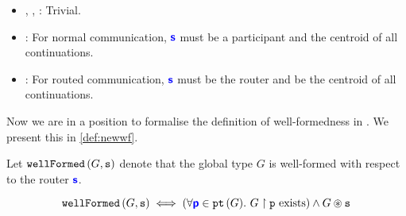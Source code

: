 \begin{itemize}
\item 
{}, 
, 
:
Trivial.

\item 
{}:
For normal communication, ${\color{blue}\bm{\mathsf{s}}}$ must
be a participant and the centroid of all continuations.

\item 
{}:
For routed communication, ${\color{blue}\bm{\mathsf{s}}}$ must
be the router and be the centroid of all continuations.

\end{itemize}

Now we are in a position to formalise the definition
of well-formedness in \newtheory. We present this in
\cref{def:newwf}.

\begin{definition}
Let $\textnormal{\texttt{wellFormed}}\left(G, {\mathtt{s}}\right)$ 
denote that the global type $G$
is well-formed with respect to the router ${\color{blue}\bm{\mathsf{s}}}$.

\[
\textnormal{\texttt{wellFormed}}\left(G, {\mathtt{s}}\right) \iff 
(\forall {\color{blue}\bm{\mathsf{p}}} \in {\textnormal{\texttt{pt}}\left({G}\right)}. ~ {G} \upharpoonright {\mathtt{p}} \text{ exists})
\wedge
{G} \circledast {\mathtt{s}}
\]

\label{def:newwf}
\end{definition}